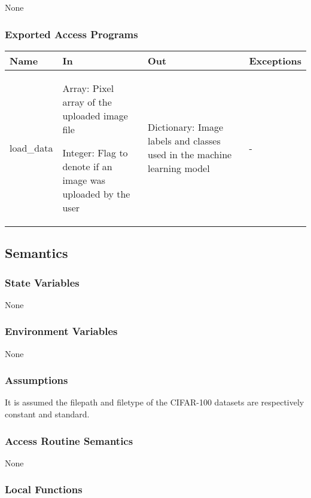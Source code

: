\documentclass[12pt, titlepage]{article}
\begin{document}
None

\subsubsection{Exported Access Programs}

\begin{center}
\begin{tabular}{p{2cm} p{4cm} p{4cm} p{2cm}}
\hline
\textbf{Name} & \textbf{In} & \textbf{Out} & \textbf{Exceptions} \\
\hline
load\_data & \item{Array: Pixel array of the uploaded image file} \item{Integer: Flag to denote if an image was uploaded by the user} & Dictionary: Image labels and classes used in the machine learning model & - \\
\hline
\end{tabular}
\end{center}

\subsection{Semantics}

\subsubsection{State Variables}

None

\subsubsection{Environment Variables}

None

\subsubsection{Assumptions}

It is assumed the filepath and filetype of the CIFAR-100 datasets are respectively constant and standard.

\subsubsection{Access Routine Semantics}

None

\subsubsection{Local Functions}
\end{document}
